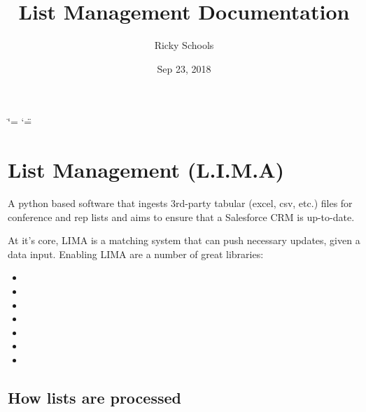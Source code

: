 \documentclass[letterpaper,10pt,english]{sphinxmanual}
\title{List Management Documentation}
\date{Sep 23, 2018}
\author{Ricky Schools}
\begin{document}
\ifdefined\shorthandoff
  \ifnum\catcode`\=\string=\active\shorthandoff{=}\fi
  \ifnum\catcode`\"=\active{}\fi
\fi

\maketitle
\sphinxtableofcontents
{}\label{\detokenize{index::doc}}



\chapter{List Management (L.I.M.A)}
\label{\detokenize{index:list-management-l-i-m-a}}
A python based software that ingests 3rd-party tabular (excel, csv, etc.) files for conference and rep lists and aims to ensure that a Salesforce CRM is up-to-date.

At it’s core, LIMA is a matching system that can push necessary updates, given a data input. Enabling LIMA are a number of great libraries:
\begin{itemize}
\item {} 

\item {} 

\item {} 

\item {} 

\item {} 

\item {} 

\item {} 

\end{itemize}


\section{How lists are processed}
\label{\detokenize{index:how-lists-are-processed}}
\end{document}
